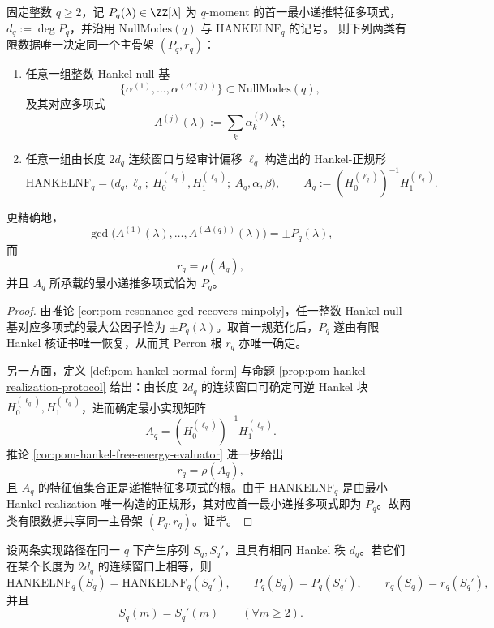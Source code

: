 \begin{theorem}\label{thm:conclusion-hankel-null-hankelnf-common-skeleton}
固定整数 \(q\ge 2\)，记 \(P_q(\lambda)\in\ZZ[\lambda]\) 为 \(q\)-moment 的首一最小递推特征多项式，\(d_q:=\deg P_q\)，并沿用 \(\mathrm{NullModes}(q)\) 与 \(\mathrm{HANKELNF}_q\) 的记号。
则下列两类有限数据唯一决定同一个主骨架 \((P_q,r_q)\)：
\begin{enumerate}
  \item 任意一组整数 Hankel-null 基
  \[
  \{\alpha^{(1)},\dots,\alpha^{(\Delta(q))}\}\subset \mathrm{NullModes}(q),
  \]
  及其对应多项式
  \[
  A^{(j)}(\lambda):=\sum_k \alpha^{(j)}_k\lambda^k;
  \]
  \item 任意一组由长度 \(2d_q\) 连续窗口与经审计偏移 \(\ell_q\) 构造出的 Hankel-正规形
  \[
  \mathrm{HANKELNF}_q=
  \bigl(d_q,\ell_q;\ H_0^{(\ell_q)},H_1^{(\ell_q)};\ A_q,\alpha,\beta\bigr),
  \qquad
  A_q:=(H_0^{(\ell_q)})^{-1}H_1^{(\ell_q)}.
  \]
\end{enumerate}
更精确地，
\[
\gcd\bigl(A^{(1)}(\lambda),\dots,A^{(\Delta(q))}(\lambda)\bigr)=\pm P_q(\lambda),
\]
而
\[
r_q=\rho(A_q),
\]
并且 \(A_q\) 所承载的最小递推多项式恰为 \(P_q\)。
\end{theorem}

\begin{proof}
由推论 \ref{cor:pom-resonance-gcd-recovers-minpoly}，任一整数 Hankel-null 基对应多项式的最大公因子恰为 \(\pm P_q(\lambda)\)。取首一规范化后，\(P_q\) 遂由有限 Hankel 核证书唯一恢复，从而其 Perron 根 \(r_q\) 亦唯一确定。

另一方面，定义 \ref{def:pom-hankel-normal-form} 与命题 \ref{prop:pom-hankel-realization-protocol} 给出：由长度 \(2d_q\) 的连续窗口可确定可逆 Hankel 块 \(H_0^{(\ell_q)},H_1^{(\ell_q)}\)，进而确定最小实现矩阵
\[
A_q=(H_0^{(\ell_q)})^{-1}H_1^{(\ell_q)}.
\]
推论 \ref{cor:pom-hankel-free-energy-evaluator} 进一步给出
\[
r_q=\rho(A_q),
\]
且 \(A_q\) 的特征值集合正是递推特征多项式的根。由于 \(\mathrm{HANKELNF}_q\) 是由最小 Hankel realization 唯一构造的正规形，其对应首一最小递推多项式即为 \(P_q\)。故两类有限数据共享同一主骨架 \((P_q,r_q)\)。证毕。
\end{proof}

\begin{corollary}[机制同一性的有限窗口塌缩]\label{cor:conclusion-hankel-window-identity-collapses-to-monic-skeleton}
设两条实现路径在同一 \(q\) 下产生序列 \(S_q,S_q'\)，且具有相同 Hankel 秩 \(d_q\)。若它们在某个长度为 \(2d_q\) 的连续窗口上相等，则
\[
\mathrm{HANKELNF}_q(S_q)=\mathrm{HANKELNF}_q(S_q'),
\qquad
P_q(S_q)=P_q(S_q'),
\qquad
r_q(S_q)=r_q(S_q'),
\]
并且
\[
S_q(m)=S_q'(m)\qquad (\forall m\ge 2).
\]
\end{corollary}

